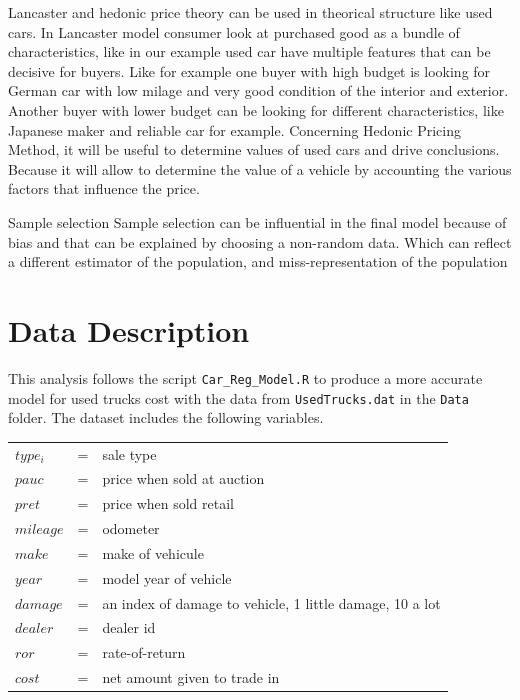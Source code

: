 \documentclass[11pt]{paper}
\begin{document}
\vskip 12pt

Lancaster and hedonic price theory can be used in theorical structure like used cars.
\vskip 12pt
In Lancaster model consumer look at purchased good as a bundle of characteristics, like in our example used car have multiple features that can be decisive for buyers. Like for example one buyer with high budget is looking for German car with low milage and very good condition of the interior and exterior. Another buyer with lower budget can be looking for different characteristics, like Japanese maker and reliable car for example. 
\vskip 12pt
Concerning Hedonic Pricing Method, it will be useful to determine values of used cars and drive conclusions. Because it will allow to determine the value of a vehicle by accounting the various factors that influence the price. 

Sample selection 
\vskip 12pt
Sample selection can be influential in the final model because of bias and that can be explained by choosing a non-random data. Which can reflect a different estimator of the population, and miss-representation of the population

\clearpage
\section{Data Description}

This analysis follows the script \texttt{Car\_Reg\_Model.R} to produce a more accurate model for used trucks cost with the data from \texttt{UsedTrucks.dat} in the \texttt{Data} folder. 
The dataset includes the following variables.
\begin{table}[h!]
\begin{tabular}{l l l}

$type_i$ & = & sale type \\

$pauc$ & = & price when sold at auction \\
$ pret$ & = &price when sold retail \\ 
$mileage$ & = & odometer \\ %
$make$ & = &make of vehicule \\
$year$ & = &model year of vehicle \\ 
$damage$ & = & an index of damage to vehicle, 1 little damage, 10 a lot\\
$dealer$ & = & dealer id \\ 
$ror$& = &rate-of-return\\
$cost$& = &net amount given to trade in\\


\end{tabular}
\end{table}
%
\clearpage
\end{document}

